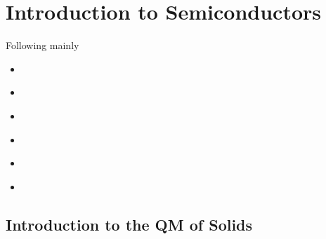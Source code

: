 \documentclass[letterpaper,10pt,english]{jupyterBook}
\begin{document}
\chapter{Introduction to Semiconductors}
\label{\detokenize{ch/solid-state/semiconductors-intro:introduction-to-semiconductors}}\label{\detokenize{ch/solid-state/semiconductors-intro:semiconductors-intro}}\label{\detokenize{ch/solid-state/semiconductors-intro::doc}}
\sphinxAtStartPar
Following mainly 
\begin{itemize}
\item {} 
\sphinxAtStartPar
{\hyperref[\detokenize{ch/solid-state/semiconductors-solids-qm:semiconductors-solids-qm}]{}}

\item {} 
\sphinxAtStartPar
{\hyperref[\detokenize{ch/solid-state/semiconductors-equilibrium:semiconductors-equilibrium}]{}}

\item {} 
\sphinxAtStartPar
{\hyperref[\detokenize{ch/solid-state/semiconductors-transport-phenomena:semiconductors-transport-phenomena}]{}}

\item {} 
\sphinxAtStartPar
{\hyperref[\detokenize{ch/solid-state/semiconductors-non-equilibrium:semiconductors-non-equilibrium}]{}}

\item {} 
\sphinxAtStartPar
{\hyperref[\detokenize{ch/solid-state/semiconductors-pn-junctions:semiconductors-pn-junctions}]{}}

\item {} 
\sphinxAtStartPar
{\hyperref[\detokenize{ch/solid-state/semiconductors-pn-diodes:semiconductors-pn-diodes}]{}}

\end{itemize}

\sphinxstepscope


\section{Introduction to the QM of Solids}
\label{\detokenize{ch/solid-state/semiconductors-solids-qm:introduction-to-the-qm-of-solids}}\label{\detokenize{ch/solid-state/semiconductors-solids-qm:semiconductors-solids-qm}}\label{\detokenize{ch/solid-state/semiconductors-solids-qm::doc}}
\end{document}
